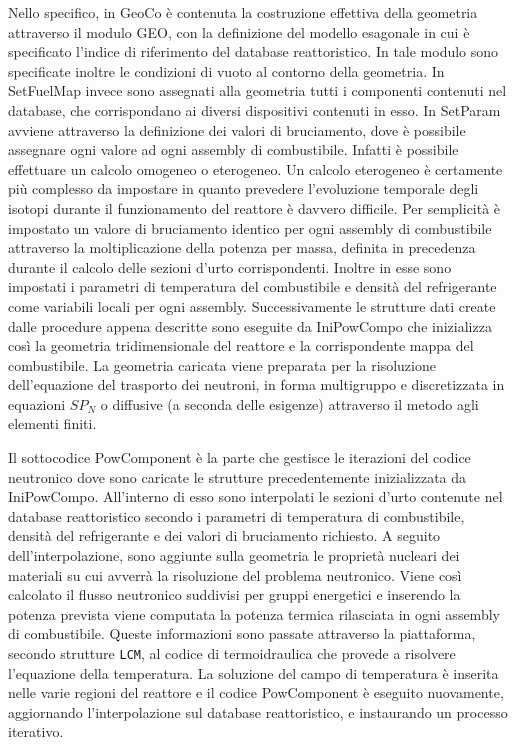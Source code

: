 Nello specifico, in GeoCo è contenuta la costruzione effettiva della geometria attraverso il 
modulo GEO, con la definizione del modello esagonale in cui è specificato 
l'indice di riferimento del database reattoristico. 
In tale modulo sono specificate inoltre le condizioni di vuoto al contorno della geometria.
In SetFuelMap invece sono assegnati alla geometria tutti i componenti contenuti 
nel database, che corrispondano ai diversi dispositivi contenuti in 
esso.
In SetParam avviene attraverso la definizione dei valori di bruciamento, dove è 
possibile assegnare ogni valore ad ogni assembly di combustibile.
Infatti è possibile effettuare un calcolo omogeneo o eterogeneo. Un calcolo 
eterogeneo è certamente più complesso da impostare in quanto prevedere 
l'evoluzione temporale degli isotopi durante il funzionamento del reattore è 
davvero difficile.
Per semplicità è impostato un valore di bruciamento identico per ogni assembly 
di combustibile attraverso la moltiplicazione della potenza per massa, definita 
in precedenza durante il calcolo delle sezioni d'urto corrispondenti.
Inoltre in esse sono impostati i parametri di temperatura del combustibile e 
densità del refrigerante come variabili locali per ogni assembly.
Successivamente le strutture dati create dalle procedure appena descritte sono 
eseguite da IniPowCompo che 
inizializza così la geometria tridimensionale del reattore e la corrispondente 
mappa del combustibile.
La geometria caricata viene preparata per la risoluzione dell'equazione del 
trasporto dei neutroni, in forma multigruppo e discretizzata in equazioni $SP_N$ o diffusive (a seconda delle 
esigenze) attraverso il metodo agli elementi 
finiti.

Il sottocodice PowComponent è la parte che gestisce le iterazioni del codice 
neutronico dove sono caricate le strutture precedentemente inizializzata da 
IniPowCompo.
All'interno di esso sono interpolati le sezioni d'urto contenute nel database 
reattoristico secondo i parametri di temperatura di combustibile, densità del 
refrigerante e dei valori di bruciamento richiesto.
A seguito dell'interpolazione, sono aggiunte sulla geometria le proprietà 
nucleari dei materiali su cui avverrà la risoluzione del problema neutronico.
Viene così calcolato il flusso neutronico suddivisi per gruppi energetici e 
inserendo la potenza prevista viene computata la potenza termica rilasciata in 
ogni assembly di combustibile. Queste informazioni sono passate attraverso la 
piattaforma, secondo strutture \texttt{LCM}, al codice di termoidraulica che provede a 
risolvere l'equazione della temperatura. La soluzione del campo di temperatura 
è 
inserita nelle varie regioni del reattore e il codice PowComponent è eseguito 
nuovamente, aggiornando l'interpolazione sul database reattoristico, e 
instaurando un processo iterativo.

